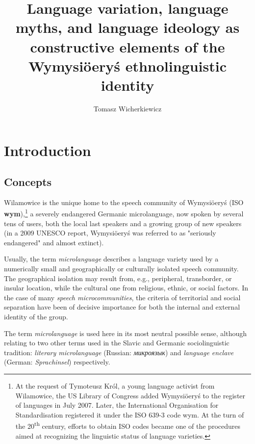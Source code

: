 \documentclass[output=paper]{langscibook}
\author{Tomasz Wicherkiewicz\affiliation{Adam Mickiewicz University Poznań}}
\title{Language variation, language myths, and language ideology as constructive elements of the Wymysiöeryś  ethnolinguistic identity}
\begin{document}
\maketitle
\section{Introduction} 
\subsection{Concepts}
Wilamowice is the unique home to the speech community of Wymysiöeryś (ISO \textbf{wym}),\footnote{At the request of Tymoteusz Król, a young language activist from Wilamowice, the US Library of Congress added Wymysiöeryś to the register of languages in July 2007. Later, the International Organisation for Standardisation registered it under the ISO 639-3 code wym. 
At the turn of the 20\textsuperscript{th} century, efforts to obtain ISO codes became one of the procedures aimed at recognizing the linguistic status of language varieties.} a severely endangered Germanic microlanguage, now spoken by several tens of users, both the local last speakers and a growing group of new speakers (in a 2009 UNESCO report, Wymysiöeryś was referred to as "seriously endangered" and almost extinct).

Usually, the term \textit{microlanguage} describes a language variety used by a numerically small and geographically or culturally isolated speech community. The geographical isolation may result from, e.g., peripheral, transborder, or insular location, while the cultural one from religious, ethnic, or social factors. In the case of many \textit{speech microcommunities}, the criteria of territorial and social separation have been of decisive importance for both the internal and external identity of the group. 

The term \textit{microlanguage} is used here in its most neutral possible sense, although relating to two other terms used in the Slavic and Germanic sociolinguistic tradition: \textit{literary microlanguage} (Russian: \textit{микроязык}) and \textit{language enclave} (German: \textit{Sprachinsel}) respectively.
\end{document}
